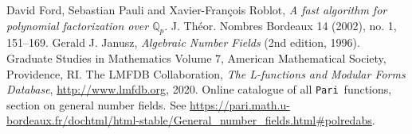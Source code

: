 \documentclass{article}
\def\Pari{{\tt Pari}}
\def\Z{{\mathbb Z}}
\def\OO{{\mathcal O}}
\def\a{{\mathfrak a}}
\def\p{{\mathfrak p}}
\begin{document}
\begin{comment}
\subsection{Standard uniformisers}
Let~$\p$ be a prime of~$K$. We define the \emph{standard uniformiser} of~$\p$,
i.e. a standard element~$\pi$ of~$\OO_K$ such that~$v_\p(\pi)=1$, as follows:
\begin{itemize}
  \item if~$\p$ is unramified, $\pi=p$;
  \item if~$\p$ is ramified, then~$\pi$ is, among the vectors~$b_1,\dots,b_d$ of
    the standard basis of~$\p$, the first one such that~$b_i\notin\p^2$.
\end{itemize}
In the unramified case, it is clear that~$v_\p(\pi)=1$. In the ramified case, we
know that not all~$b_i$ are contained in~$\p^2$ since~$\p\neq\p^2$, so the
definition makes sense; moreover~$\pi \in\p\setminus\p^2$ and
therefore~$v_\p(\pi)=1$.

\subsection{Standard generators}
Let~$\a\subset\OO_K$ be a nonzero integral ideal. Let~$N$ be the positive
integer such that~$\a\cap\Z = N\Z$. Let~$\p_1,\dots,\p_k$ be the primes
dividing~$N\OO_K$ (note that these may be more than the primes dividing~$\a$),
and let~$\pi_1,\dots,\pi_k$ be the corresponding standard uniformisers.
Write~$N\OO_K = \prod_{i=1}^k\p_i^{n_i}$ and~$\a = \prod_{i=1}^k\p_i^{a_i}$
with~$n_i,a_i\in\Z_{\ge 0}$ (some~$a_i$ can be~$0$). Let~$\bar{g}$ be the unique
element of~$\OO_K/N\OO_K$ that is congruent to~$\pi_i^{a_i} \bmod{\p_i^{n_i}}$,
and let~$g\in\OO_K$ be the standard lift of~$\bar{g}$.

We claim that~$\a = (N,g)$. Indeed, the only primes that divide either~$\a$
or~$(N,g)$ are the~$\p_i$; moreover for every~$\p_i$ by construction we have~$v_{\p_i}(g)=
a_i$ if~$a_i<n_i$ and~$v_{\p_i}(g)\ge n_i$ if~$a_i=n_i$, and
therefore~$v_{\p_i}((N,g)) = \min(n_i,v_{\p_i}(g)) = a_i = v_{\p_i}(\a)$. This proves the
claim.

We define the \emph{standard generators} of~$\a$ to be~$(N,g)$.

\end{comment}


\begin{thebibliography}{10}
 David Ford, Sebastian Pauli and Xavier-Fran\c cois Roblot, {\em
  A fast algorithm for polynomial factorization over $\mathbb{Q}_p$}. J.
  Th\'eor. Nombres Bordeaux 14 (2002), no. 1, 151--169.
 Gerald J. Janusz, {\em Algebraic Number Fields} (2nd
  edition, 1996).  Graduate Studies in Mathematics Volume 7, American
  Mathematical Society, Providence, RI.
 The {LMFDB Collaboration},
{\em The L-functions and Modular Forms Database},
\url{http://www.lmfdb.org}, 2020.
 Online catalogue of all \Pari\ functions, section
  on general number fields.  See
  \href{https://pari.math.u-bordeaux.fr/dochtml/html-stable/General_number_fields.html\#polredabs}{\url{https://pari.math.u-bordeaux.fr/dochtml/html-stable/General_number_fields.html\#polredabs}}.
\end{thebibliography}
\end{document}
